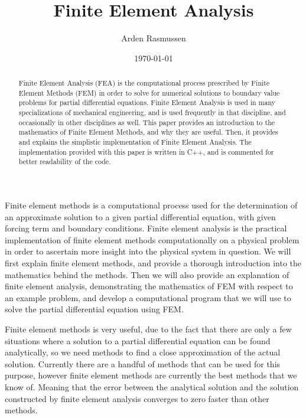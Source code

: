 \documentclass[draft,10pt]{armath}
\title{Finite Element Analysis}
\author{Arden Rasmussen}
\date{\today}
\numberwithin{equation}{section}
\theoremstyle{definition}
\begin{document}
\maketitle

\begin{abstract}
  Finite Element Analysis (FEA) is the computational process prescribed by
  Finite Element Methods (FEM) in order to solve for numerical solutions to
  boundary value problems for partial differential equations. Finite Element
  Analysis is used in many specializations of mechanical engineering, and is
  used frequently in that discipline, and occasionally in other disciplines as
  well. This paper provides an introduction to the mathematics of Finite
  Element Methods, and why they are useful. Then, it provides and explains the
  simplistic implementation of Finite Element Analysis. The implementation
  provided with this paper is written in C++, and is commented for better
  readability of the code.
\end{abstract}


Finite element methods is a computational process used for the determination of
an approximate solution to a given partial differential equation, with given
forcing term and boundary conditions. Finite element analysis is the practical
implementation of finite element methods computationally on a physical problem
in order to ascertain more insight into the physical system in question. We
will first explain finite element methods, and provide a thorough introduction
into the mathematics behind the methods. Then we will also provide an
explanation of finite element analysis, demonstrating the mathematics of FEM
with respect to an example problem, and develop a computational program that we
will use to solve the partial differential equation using FEM.

Finite element methods is very useful, due to the fact that there are only a
few situations where a solution to a partial differential equation can be found
analytically, so we need methods to find a close approximation of the actual
solution. Currently there are a handful of methods that can be used for this
purpose, however finite element methods are currently the best methods that we
know of. Meaning that the error between the analytical solution and the
solution constructed by finite element analysis converges to zero faster than
other methods.
\end{document}
